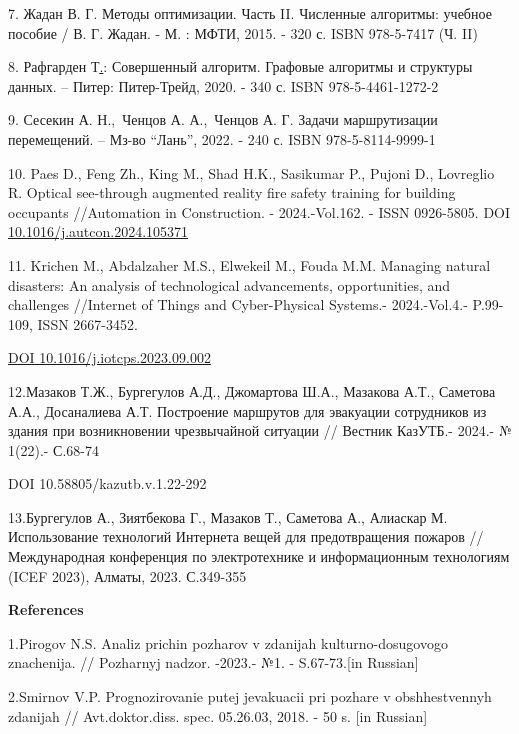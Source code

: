 \documentclass[
]{article}
\begin{document}
7. Жадан В. Г. Методы оптимизации. Часть II. Численные алгоритмы:
учебное пособие / В. Г. Жадан. - М. : МФТИ, 2015. - 320 с. ISBN
978-5-7417 (Ч. II)

8. Рафгарден
Т\href{https://www.meloman.kz/other/rafgarden-t-sovershennyj-algoritm-grafovye-algoritmy-i-struktury-dannyh.html?srsltid=AfmBOoonzl3DLF5EZHXaStUKbeOPMt0iOX2nrgpmPI-HIND3-7hOvRYs}{.}:
Совершенный алгоритм. Графовые алгоритмы и структуры данных. -- Питер:
Питер-Трейд, 2020. - 340 с. ISBN 978-5-4461-1272-2

9. Сесекин А. Н.,~Ченцов А. А.,~Ченцов А. Г. Задачи маршрутизации
перемещений. -- Мз-во ``Лань'', 2022. - 240 с. ISBN 978-5-8114-9999-1

10. Paes D., Feng Zh., King M., Shad H.K., Sasikumar P., Pujoni D.,
Lovreglio R. Optical see-through augmented reality fire safety training
for building occupants //Automation in Construction. - 2024.-Vol.162. -
ISSN 0926-5805. DOI
\href{https://doi.org/10.1016/j.autcon.2024.105371}{10.1016/j.autcon.2024.105371}

11. Krichen M., Abdalzaher M.S., Elwekeil M., Fouda M.M. Managing
natural disasters: An analysis of technological advancements,
opportunities, and challenges //Internet of Things and Cyber-Physical
Systems.- 2024.-Vol.4.- P.99-109, ISSN 2667-3452.

\href{https://doi.org/10.1016/j.iotcps.2023.09.002}{DOI
10.1016/j.iotcps.2023.09.002}

12.Мазаков Т.Ж., Бургегулов А.Д., Джомартова Ш.А., Мазакова А.Т.,
Саметова А.А., Досаналиева А.Т. Построение маршрутов для эвакуации
сотрудников из здания при возникновении чрезвычайной ситуации // Вестник
КазУТБ.- 2024.- № 1(22).- С.68-74

DOI 10.58805/kazutb.v.1.22-292

13.Бургегулов А., Зиятбекова Г., Мазаков Т., Саметова А., Алиаскар М.
Использование технологий Интернета вещей для предотвращения пожаров //
Международная конференция по электротехнике и информационным технологиям
(ICEF 2023), Алматы, 2023. С.349-355

\textbf{\hfill\break
References}

1.Pirogov N.S. Analiz prichin pozharov v zdanijah
kul\textquotesingle turno-dosugovogo znachenija. // Pozharnyj nadzor.
-2023.- №1. - S.67-73.{[}in Russian{]}

2.Smirnov V.P. Prognozirovanie putej jevakuacii pri pozhare v
obshhestvennyh zdanijah // Avt.doktor.diss. spec. 05.26.03, 2018. - 50
s. {[}in Russian{]}
\end{document}
